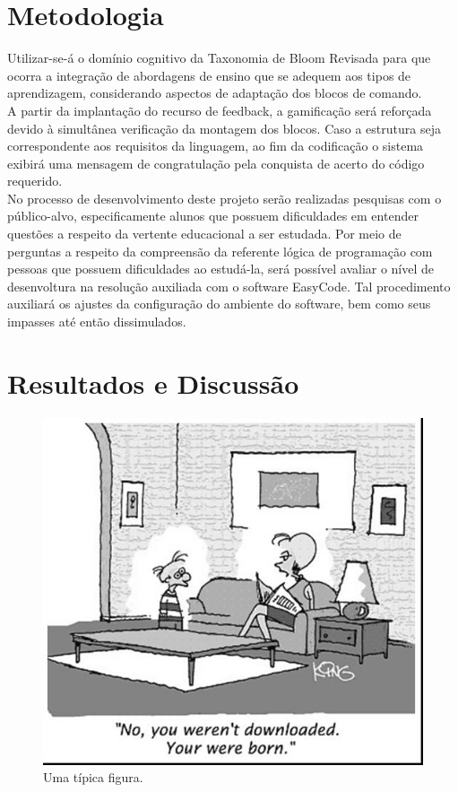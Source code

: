 \documentclass[12pt]{article}
\begin{document}
\section{Metodologia} 
Utilizar-se-á o domínio cognitivo da Taxonomia de Bloom Revisada para que ocorra a integração de abordagens de ensino que se adequem aos tipos de aprendizagem, considerando aspectos de adaptação dos blocos de comando.\\
A partir da implantação do recurso de feedback, a gamificação será reforçada devido à simultânea verificação da montagem dos blocos. Caso a estrutura seja correspondente aos requisitos da linguagem, ao fim da codificação o sistema exibirá uma mensagem de congratulação pela conquista de acerto do código requerido.\\
No processo de desenvolvimento deste projeto serão realizadas pesquisas com o público-alvo, especificamente alunos que possuem dificuldades em entender questões a respeito da vertente educacional a ser estudada. Por meio de perguntas a respeito da compreensão da referente lógica de programação com pessoas que possuem dificuldades ao estudá-la, será possível avaliar o nível de desenvoltura na resolução auxiliada com o software EasyCode. Tal procedimento auxiliará os ajustes da configuração do ambiente do software, bem como seus impasses até então dissimulados.


\section{Resultados e Discussão}
	\begin{figure}[h]
		\centering
		\includegraphics[scale=0.2]{fig1.jpg}
		\caption{Uma típica figura.}
		\label{fig1}
	\end{figure}
\end{document}

